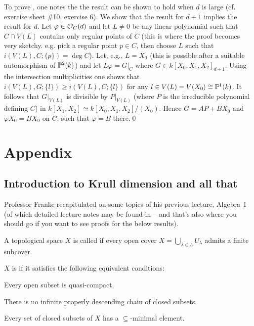\documentclass[a4paper,parskip=half,numbers=enddot, DIV=12, headheight=30pt]{scrreprt}
\begin{document}
To prove , one notes the the result can be shown to hold when $d$ is large (cf. exercise sheet \#10, exercise 6).
We show that the result for $d+1$ implies the result for $d$.
Let $\varphi\in \mathcal{O}_C(d)$
and let $L\neq 0$ be any linear polynomial such that $C\cap V(L)$ contains only regular points of $C$
(this is where the proof becomes very sketchy. e.g. pick a regular point $p\in C$,
then choose $L$ such that $i(V(L),C;\{p\})=\deg C$).
Let, e.g., $L=X_0$ (this is possible after a suitable automorphism of $\mathbb{P}^2(k)$) and let $L\varphi = G\vert_C$ where
$G\in k[X_0,X_1,X_2]_{d+1}$. Using the intersection multiplicities one shows that $i(V(L),G;\{l\})\geq i(V(L),C;\{l\})$ for any $l\in V(L) = V(X_0)\cong \mathbb{P}^1(k)$.
It follows that $G\vert_{V(L)}$ is divisible by $P\vert_{V(L)}$ (where $P$ is
the irreducible polynomial defining $C$) in $k[X_1,X_2] \simeq k[X_0,X_1,X_2]/(X_0)$. Hence
$G=AP+BX_0$ and $\varphi X_0=BX_0$ on $C$, such that $\varphi=B$ there.\qed





















\appendix
\chapter{Appendix}
\setcounter{thm}{0}
\renewcommand*{\thethm}{\Alph{thm}}
\section{Introduction to Krull dimension and all that}
Professor Franke recapitulated on some topics of his previous lecture, Algebra~I (of which detailed lecture notes may be found in \cite{alg1} -- and that's also where you should go if you want to see proofs for the below results).
\begin{defi}
	A topological space $X$ is called  if every open cover $X = \bigcup_{\lambda\in\Lambda} U_\lambda$ admits a finite subcover.
	
	$X$ is  if it satisfies the following equivalent conditions:
	\begin{alphanumerate}
		\item Every open subset is quasi-compact.
		\item There is no infinite properly descending chain of closed subsets.
		\item Every set of closed subsets of $X$ has a $\subseteq$-minimal element.
	\end{alphanumerate}
\end{defi}
\end{document}
